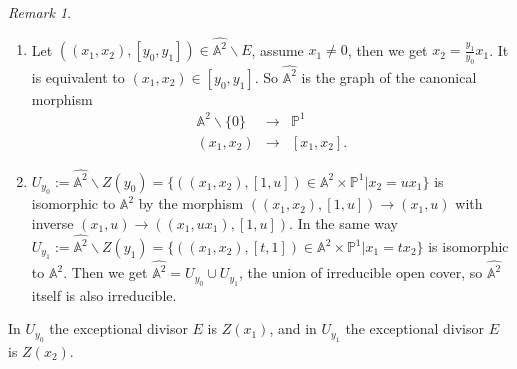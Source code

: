 \documentclass{amsart}
\theoremstyle{plain}
\theoremstyle{definition}
\theoremstyle{remark}
\newtheorem*{remark}{Remark}
\numberwithin{equation}{section}
\begin{document}
 \begin{remark}
 	\begin{enumerate}
 		\item Let $ ((x_1,x_2),[y_0,y_1])\in \hat{\mathbb{A}^2}\backslash E $, assume $ x_1\neq 0 $, then we get $ x_2=\frac{y_1}{y_0}x_1 $. It is equivalent to $ (x_1,x_2)\in [y_0,y_1] $. So $ \hat{\mathbb{A}^2} $ is the graph of the canonical morphism
 		$$
 		\begin{array}{ccc}
 		\mathbb{A}^2\backslash \{0\} & \to & \mathbb{P}^1\\
 		(x_1,x_2) & \to & [x_1,x_2].
 		\end{array}
 		$$
 		\item $ U_{y_0}:=\hat{\mathbb{A}^2}\backslash Z(y_0)=\{((x_1,x_2),[1,u])\in\mathbb{A}^2\times \mathbb{P}^1|x_2=ux_1 \} $ is isomorphic to $ \mathbb{A}^2 $ by the morphism $ ((x_1,x_2),[1,u])\to (x_1,u) $ with inverse $ (x_1,u)\to ((x_1,ux_1),[1,u]) $. In the same way $ U_{y_1}:=\hat{\mathbb{A}^2}\backslash Z(y_1)=\{ ((x_1,x_2),[t,1])\in \mathbb{A}^2\times\mathbb{P}^1|x_1=tx_2 \}$ is isomorphic to $ \mathbb{A}^2 $. Then we get $ \hat{\mathbb{A}^2}=U_{y_0}\cup U_{y_1} $, the union of irreducible open cover, so $ \hat{\mathbb{A}^2} $ itself is also irreducible. 
 	\end{enumerate}
 \end{remark}
 In $ U_{y_0} $ the exceptional divisor $ E $ is $ Z(x_1) $, and in $ U_{y_1} $ the exceptional divisor $ E $ is $ Z(x_2) $.
\end{document}
